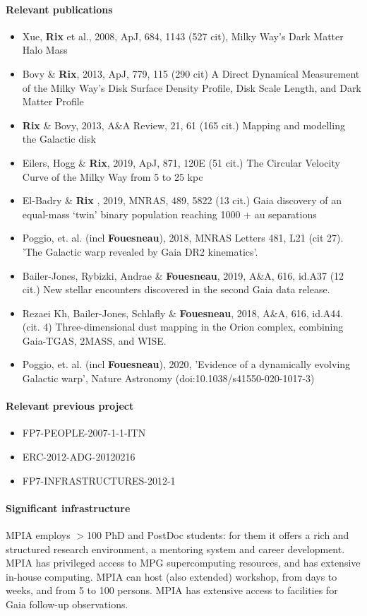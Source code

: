 \paragraph{Relevant publications}
\begin{itemize}
    \item Xue, \textbf{Rix} et al., 2008, ApJ, 684, 1143 (527 cit), Milky Way's Dark Matter Halo Mass
    \item Bovy \& \textbf{Rix}, 2013, ApJ, 779, 115 (290 cit) A Direct Dynamical Measurement of the Milky Way's Disk Surface Density Profile, Disk Scale Length, and Dark Matter Profile 
    \item \textbf{Rix} \& Bovy, 2013, A\&A Review, 21, 61 (165 cit.) Mapping and modelling the Galactic disk
    \item Eilers, Hogg \& \textbf{Rix}, 2019, ApJ, 871, 120E (51 cit.) The Circular Velocity Curve of the Milky Way from 5 to 25 kpc
    \item El-Badry \& \textbf{Rix} , 2019, MNRAS, 489, 5822 (13 cit.) Gaia discovery of an equal-mass `twin' binary population reaching 1000 + au separations
    \item Poggio, et. al. (incl \textbf{Fouesneau}), 2018, MNRAS Letters 481, L21 (cit 27). 'The Galactic warp revealed by Gaia DR2 kinematics'. 
    \item {{Bailer-Jones}, {Rybizki}, {Andrae} \&
         \textbf{Fouesneau}}, 2019, A\&A, 616, id.A37 (12 cit.) {New stellar encounters discovered in the second Gaia data release}.
    \item {Rezaei Kh, Bailer-Jones, Schlafly \& \textbf{Fouesneau}}, 2018, A\&A, 616, id.A44. (cit. 4) Three-dimensional dust mapping in the Orion complex, combining Gaia-TGAS, 2MASS, and WISE.
    \item Poggio, et. al. (incl \textbf{Fouesneau}), 2020, 'Evidence of a dynamically evolving Galactic warp', Nature Astronomy (doi:10.1038/s41550-020-1017-3)
    
\end{itemize}

\paragraph{Relevant previous project}
\begin{itemize}
    \item FP7-PEOPLE-2007-1-1-ITN
    \item ERC-2012-ADG-20120216
    \item FP7-INFRASTRUCTURES-2012-1
\end{itemize}

\paragraph{Significant infrastructure}
MPIA employs $>$100 PhD and PostDoc students: for them it offers 
a rich and structured research environment, a mentoring system
and career development. MPIA has privileged access to MPG supercomputing resources,
and has extensive in-house computing. MPIA can host (also extended) workshop, from days to weeks, and from 5 to 100 persons. 
MPIA has extensive access to facilities for Gaia follow-up observations.

